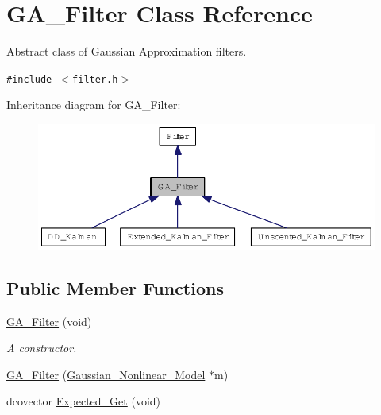 \hypertarget{class_g_a___filter}{
\section{GA\_\-Filter Class Reference}
\label{class_g_a___filter}
}
Abstract class of Gaussian Approximation filters.  


{\tt \#include $<$filter.h$>$}

Inheritance diagram for GA\_\-Filter:\nopagebreak
\begin{figure}[H]
\begin{center}
\leavevmode
\includegraphics[width=400pt]{class_g_a___filter__inherit__graph}
\end{center}
\end{figure}
\subsection*{Public Member Functions}
\begin{CompactItemize}
\item 
\hyperlink{class_g_a___filter_7115851ae209079a5779026aa72aaaee}{GA\_\-Filter} (void)
\begin{CompactList}\small\item\em A constructor. \item\end{CompactList}\item 
\hyperlink{class_g_a___filter_07865b9b0bbc296fc1b156d4f0c9d4f4}{GA\_\-Filter} (\hyperlink{class_gaussian___nonlinear___model}{Gaussian\_\-Nonlinear\_\-Model} $\ast$m)
\item 
dcovector \hyperlink{class_g_a___filter_e92898cc15e34358cb9ecabd57067a39}{Expected\_\-Get} (void)
\end{CompactItemize}
